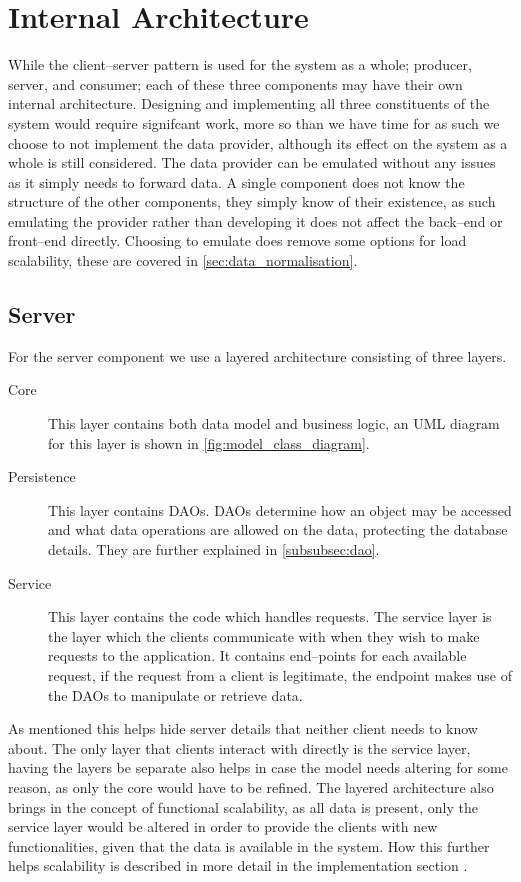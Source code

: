 \section{Internal Architecture}\label{sec:internal_architecture}
While the client--server pattern is used for the system as a whole; producer, server, and consumer; each of these three components may have their own internal architecture.
Designing and implementing all three constituents of the system would require signifcant work, more so than we have time for as such we choose to not implement the data provider, although its effect on the system as a whole is still considered.
The data provider can be emulated without any issues as it simply needs to forward data.
A single component does not know the structure of the other components, they simply know of their existence, as such emulating the provider rather than developing it does not affect the back--end or front--end directly.
Choosing to emulate does remove some options for load scalability, these are covered in \cref{sec:data_normalisation}.

\subsection{Server}
For the server component we use a layered architecture consisting of three layers.
\begin{description}
    \item [Core] This layer contains both data model and business logic, an UML diagram for this layer is shown in \cref{fig:model_class_diagram}.
    \item [Persistence] This layer contains \aclp{DAO}.
    \acsp{DAO} determine how an object may be accessed and what data operations are allowed on the data, protecting the database details.
    They are further explained in \cref{subsubsec:dao}.
    \item [Service] This layer contains the code which handles requests.
    The service layer is the layer which the clients communicate with when they wish to make requests to the application.
    It contains end--points for each available request, if the request from a client is legitimate, the endpoint makes use of the \acsp{DAO} to manipulate or retrieve data.
\end{description}
As mentioned this helps hide server details that neither client needs to know about.
The only layer that clients interact with directly is the service layer, having the layers be separate also helps in case the model needs altering for some reason, as only the core would have to be refined.
The layered architecture also brings in the concept of functional scalability, as all data is present, only the service layer would be altered in order to provide the clients with new functionalities, given that the data is available in the system.
How this further helps scalability is described in more detail in the implementation section .

